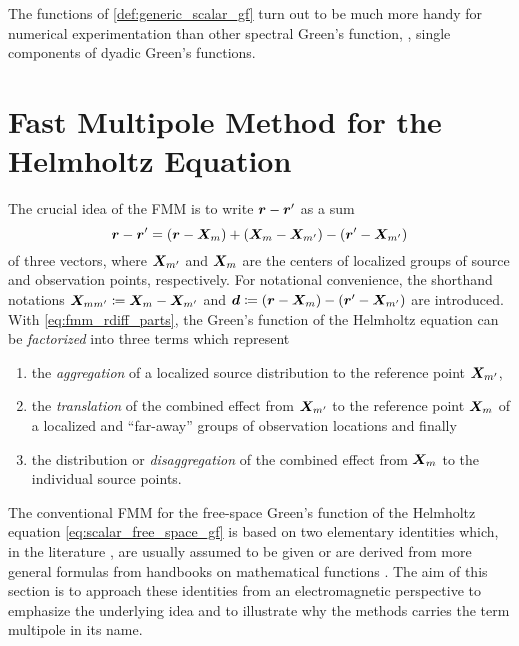 The functions of \cref{def:generic_scalar_gf} turn out to be much more 
handy for numerical experimentation than other spectral Green's function,
\eg, single components of dyadic Green's functions.










\chapter{Fast Multipole Method for the Helmholtz Equation}
\label{ch:fmm}

The crucial idea of the \ac{FMM} is to write $\rdiff$ as a sum
\begin{equation}\label{eq:fmm_rdiff_parts}
	\rdiff =
	\left( \robs - \fmmObsGroupCenter              \right) +
	\left( \fmmObsGroupCenter - \fmmSrcGroupCenter \right) -
	\left( \rsrc - \fmmSrcGroupCenter              \right)
\end{equation}
of three vectors, where $\fmmSrcGroupCenter$ and $\fmmObsGroupCenter$ are the
centers of localized groups of source and observation points, respectively.
For notational convenience, the shorthand notations 
$\fmmDiffGroupCenters \coloneqq \fmmObsGroupCenter - \fmmSrcGroupCenter$
and 
$\pvec{d} \coloneqq \left( \robs - \fmmObsGroupCenter \right) - \left( \rsrc - \fmmSrcGroupCenter \right)$
are introduced.
With \eqref{eq:fmm_rdiff_parts}, the Green's function of the Helmholtz equation
can be \emph{factorized} into three terms which represent
\begin{enumerate}
	\item the \emph{aggregation} of a localized source distribution to the
	reference point $\fmmSrcGroupCenter$, 
	\item the \emph{translation} of the combined effect from
	$\fmmSrcGroupCenter$ to the reference point $\fmmObsGroupCenter$ of a
	localized and \enquote{far-away} groups of observation locations
	and finally
	\item the distribution or \emph{disaggregation} of the combined effect from
	$\fmmObsGroupCenter$ to the individual source points.
\end{enumerate}

The conventional \ac{FMM} for the free-space Green's function
of the Helmholtz equation \eqref{eq:scalar_free_space_gf} is based on two
elementary identities which, in the literature \cite{Rokhlin1993,Coifman1993},
are usually assumed to be given or are derived from more general formulas from
handbooks on mathematical functions \cite{Abramowitz2014,Abramowitz2014}.
The aim of this section is to approach these identities from
an electromagnetic perspective to emphasize the underlying idea and to
illustrate why the methods carries the term multipole in its name.

